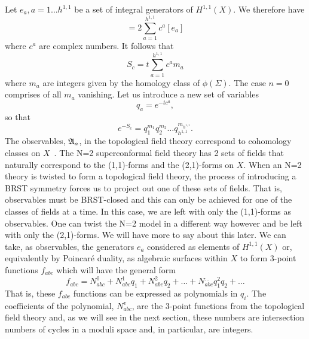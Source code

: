 Let $e_a, a=1\ldots h^{1,1}$ be a set of integral generators of
$H^{1,1}(X)$.
We therefore have
\begin{equation}
  [J] = 2\sum_{a=1}^{h^{1,1}}c^a[e_a]
\end{equation}
where $c^a$ are complex numbers. It follows that
\begin{equation}
  S_c = t\sum_{a=1}^{h^{1,1}}c^am_a \label{eq:scm}
\end{equation}
where $m_a$ are integers given by the homology class of
$\phi(\Sigma)$. The case $n=0$ comprises of all $m_a$ vanishing.
Let us introduce a new set of variables
\begin{equation}
  q_a = e^{-tc^a},
\end{equation}
so that
\begin{equation}
  e^{-S_c} = q_1^{m_1}q_2^{m_2}\ldots q_{h^{1,1}}^{m_{h^{1,1}}}.
\end{equation}
The observables, $\frak{A}_a$, in the topological field theory correspond to
cohomology classes on $X$~\cite{W:tsm}. The N=2 superconformal field
theory has 2 sets of fields that naturally correspond to the
(1,1)-forms and the (2,1)-forms on $X$.
When an N=2 theory is twisted to form a topological field theory, the
process of introducing a BRST symmetry forces us to project out one of
these sets of fields. That is, observables must be BRST-closed and
this can only be achieved for one of the classes of fields at a time.
In this case, we are left with
only the (1,1)-forms as observables. One can twist the N=2 model in a
different way however and be left with only the (2,1)-forms. We will
have more to say about this later. We can take, as observables,
the generators $e_a$
considered as elements of $H^{1,1}(X)$ or, equivalently by Poincar\'e
duality, as algebraic surfaces within $X$ to form 3-point functions
$f_{abc}$ which will have the general form
\begin{equation}
  f_{abc}=N^0_{abc} + N^1_{abc}q_1 + N^2_{abc}q_2 + \ldots +
	N^{\ldots}_{abc}q_1^2q_2 + \ldots  \label{eq:fab}
\end{equation}
That is, these $f_{abc}$ functions can be expressed as polynomials
in $q_i$. The coefficients of the polynomial, $N^v_{abc}$, are the
3-point functions from the topological field theory and, as we will
see in the next section, these numbers are intersection numbers of
cycles in a moduli space and, in particular, are integers.

